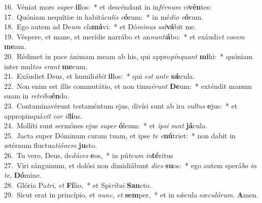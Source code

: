 {16.~}Véniat mors \textit{su}\textit{per} \textbf{il}los:~* et descéndant in in\textit{fér}\textit{num} \textit{vi}\textbf{vén}tes:\\
{17.~}Quóniam nequítiæ in habitácu\textit{lis} \textit{e}\textbf{ó}rum:~* in mé\textit{di}\textit{o} \textit{e}\textbf{ó}rum.\\
{18.~}Ego autem ad De\textit{um} \textit{cla}\textbf{má}vi:~* et Dó\textit{mi}\textit{nus} \textit{sal}\textbf{vá}bit me.\\
{19.~}Véspere, et mane, et merídie narrábo et an\textit{nun}\textit{ti}\textbf{á}bo:~* et exáudi\textit{et} \textit{vo}\textit{cem} \textbf{me}am.\\
{20.~}Rédimet in pace ánimam meam ab his, qui appro\textit{pín}\textit{quant} \textbf{mi}hi:~* quóniam inter mul\textit{tos} \textit{e}\textit{rant} \textbf{me}cum.\\
{21.~}Exáudiet Deus, et humili\textit{á}\textit{bit} \textbf{il}los:~* qui \textit{est} \textit{an}\textit{te} \textbf{sǽ}cula.\\
{22.~}Non enim est illis commutátio, et non timu\textit{é}\textit{runt} \textbf{De}um:~* exténdit manum suam in \textit{re}\textit{tri}\textit{bu}\textbf{én}do.\\
{23.~}Contaminavérunt testaméntum ejus, divísi sunt ab ira \textit{vul}\textit{tus} \textbf{e}jus:~* et appropinquá\textit{vit} \textit{cor} \textit{il}\textbf{lí}us.\\
{24.~}Mollíti sunt sermónes ejus \textit{su}\textit{per} \textbf{ó}leum:~* et \textit{i}\textit{psi} \textit{sunt} \textbf{já}cula.\\
{25.~}Jacta super Dóminum curam tuam, et ipse \textit{te} \textit{e}\textbf{nú}triet:~* non dabit in ætérnum fluctua\textit{ti}\textit{ó}\textit{nem} \textbf{ju}sto.\\
{26.~}Tu vero, Deus, de\textit{dú}\textit{ces} \textbf{e}os,~* in pú\textit{te}\textit{um} \textit{in}\textbf{té}ritus\\
{27.~}Viri sánguinum, et dolósi non dimidiábunt \textit{di}\textit{es} \textbf{su}os:~* ego autem sperá\textit{bo} \textit{in} \textit{te}, \textbf{Dó}mine.\\
{28.~}Glória Pa\textit{tri}, \textit{et} \textbf{Fí}lio,~* et Spi\textit{rí}\textit{tu}\textit{i} \textbf{San}cto.\\
{29.~}Sicut erat in princípio, et \textit{nunc}, \textit{et} \textbf{sem}per,~* et in sǽcula sæ\textit{cu}\textit{ló}\textit{rum}. \textbf{A}men.\\
